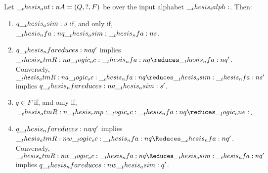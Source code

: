 \begin{theorem}
  Let $\__thesis_aut:n {A} = (Q, ?, F)$ be  over the input alphabet $\__thesis_ialph:$.
  Then:
  \begin{enumerate}
  \item $q \__thesis_asim: s$ if, and only if, $\__thesis_nfa:n {q} \__thesis_osim: \__thesis_nfa:n {s}$.
  \item $q \nfareduces[a] q'$ implies $\atmR{a} \oc \nfa{q} \reduces \nfa{q}'$.
    Conversely, $\atmR{a} \oc \nfa{q} \reduces\osim \nfa{s}'$ implies $q \nfareduces[a]\asim s'$.
  \item $q \in F$ if, and only if, $\atmR{\emp} \oc \nfa{q} \reduces \one$.
  \item $q \nfareduces[w] q'$ implies $\atmR{w} \oc \nfa{q} \Reduces \nfa{q}'$.
    Conversely, $\atmR{w} \oc \nfa{q} \Reduces\osim \nfa{q}'$ implies $q \nfareduces[w]\asim q'$.
  \end{enumerate}
\end{theorem}
%

